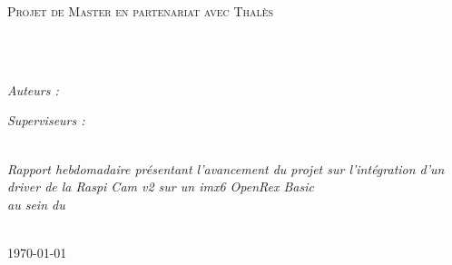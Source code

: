\documentclass[
	11pt, %
	french, %
	singlespacing, %
	headsepline, %
	]{MastersDoctoralThesis} %
\begin{document}
	\begin{titlepage}
	\begin{center}

	\vspace*{.06\textheight}
	{\scshape\LARGE \univname\par}\vspace{1.5cm} %
	\textsc{\Large Projet de Master en partenariat avec Thalès}\\[0.5cm] %

	\HRule \\[0.4cm] %
	{\huge \bfseries \ttitle\par}\vspace{0.4cm} %
	\HRule \\[1.5cm] %

	\begin{minipage}[t]{0.4\textwidth}
	\begin{flushleft} \large
	\emph{Auteurs :}\\
	\authorname %
	\end{flushleft}
	\end{minipage}
	\begin{minipage}[t]{0.4\textwidth}
	\begin{flushright} \large
	\emph{Superviseurs :} \\
	\supname %
	\end{flushright}
	\end{minipage}\\[2.5cm]

	\large \textit{Rapport hebdomadaire présentant l'avancement du projet sur l'intégration
	 d'un driver de la Raspi Cam v2 sur un imx6 OpenRex Basic}\\[0.3cm] %
	\textit{au sein du}\\[0.7cm]
	\deptname \\ [0.5cm]

	\begin{figure}[!htb]
			\centering
	\end{figure}

	{\large \today}\\[4cm] %

	\vfill
	\end{center}
	\end{titlepage}
\end{document}

